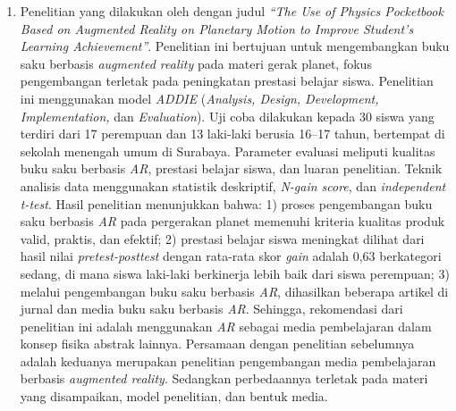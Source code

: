 \begin{enumerate}
    \item Penelitian yang dilakukan oleh \citet{suprapto2021} dengan judul \textit{“The Use of Physics Pocketbook Based on Augmented Reality on Planetary Motion to Improve Student’s Learning Achievement”}. Penelitian ini bertujuan untuk mengembangkan buku saku berbasis \textit{augmented reality} pada materi gerak planet, fokus pengembangan terletak pada peningkatan prestasi belajar siswa. Penelitian ini menggunakan model \textit{ADDIE} (\textit{Analysis, Design, Development, Implementation,} dan \textit{Evaluation}). Uji coba dilakukan kepada 30 siswa yang terdiri dari 17 perempuan dan 13 laki-laki berusia 16–17 tahun, bertempat di sekolah menengah umum di Surabaya. Parameter evaluasi meliputi kualitas buku saku berbasis \textit{AR}, prestasi belajar siswa, dan luaran penelitian. Teknik analisis data menggunakan statistik deskriptif, \textit{N-gain score}, dan \textit{independent t-test}. Hasil penelitian menunjukkan bahwa: 1) proses pengembangan buku saku berbasis \textit{AR} pada pergerakan planet memenuhi kriteria kualitas produk valid, praktis, dan efektif; 2) prestasi belajar siswa meningkat dilihat dari hasil nilai \textit{pretest-posttest} dengan rata-rata skor \textit{gain} adalah 0{,}63 berkategori sedang, di mana siswa laki-laki berkinerja lebih baik dari siswa perempuan; 3) melalui pengembangan buku saku berbasis \textit{AR}, dihasilkan beberapa artikel di jurnal dan media buku saku berbasis \textit{AR}. Sehingga, rekomendasi dari penelitian ini adalah menggunakan \textit{AR} sebagai media pembelajaran dalam konsep fisika abstrak lainnya. Persamaan dengan penelitian sebelumnya adalah keduanya merupakan penelitian pengembangan media pembelajaran berbasis \textit{augmented reality}. Sedangkan perbedaannya terletak pada materi yang disampaikan, model penelitian, dan bentuk media.

\end{enumerate}
